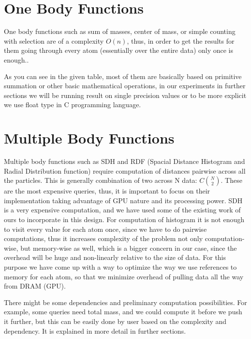 \documentclass[12pt,letterpaper]{report}
\begin{document}
\section{One Body Functions}
\hspace{3em} One body functions such as sum of masses, center of mass, or simple counting with selection  are of a complexity $O(n)$, thus, in order to get the results for them going through every atom (essentially over the entire data) only once is enough..

\noindent\hspace{3em}As you can see in the given table, most of them are basically based on primitive summation or other basic mathematical operations, in our experiments in further sections we will be running result on single precision values or to be more explicit we use float type in C programming language.

\section{Multiple Body Functions}
\noindent\hspace{3em}Multiple body functions such as SDH and RDF (Spacial Distance Histogram and Radial Distribution function) require computation of distances pairwise across all the particles. This is generally combination of two across N data: 	$C\binom{N}{2}$. These are the most expensive queries, thus, it is important to focus on their implementation taking advantage of GPU nature and its processing power. SDH is a very expensive computation, and we have used some of the existing work of ours\cite{sdhgpu} to incorporate in this design.
\clearpage
\noindent\hspace{3em}For computation of histogram it is not enough to visit every value for each atom once, since we have to do pairwise computations, thus it increases complexity of the problem not only computation-wise, but memory-wise as well, which is a bigger concern in our case, since the overhead will be huge and non-linearly relative to the size of data. For this purpose we have come up with a way to optimize the way we use references to memory for each atom, so that we minimize overhead of pulling data all the way from DRAM (GPU).

\noindent\hspace{3em}There might be some dependencies and preliminary computation possibilities. For example, some queries need total mass, and we could compute it before we push it further, but this can be easily done by user based on the complexity and dependency. It is explained in more detail in further sections.
\end{document}
